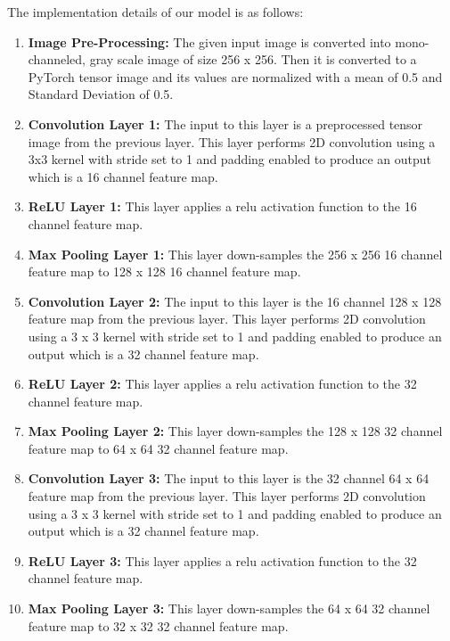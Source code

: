\documentclass[12pt]{article}
\begin{document}
The implementation details of our model is as follows: 
\begin{enumerate}
	\item \textbf{Image Pre-Processing: } The given input image is converted into mono-channeled, gray scale image of size 256 x 256. Then it is converted to a PyTorch tensor image and its values are normalized with a mean of 0.5 and Standard Deviation of 0.5.   
  
	\item \textbf{Convolution Layer 1:} The input to this layer is a preprocessed tensor image from the previous layer. This layer performs 2D convolution using a 3x3 kernel with stride set to 1 and padding enabled to produce an output which is a 16 channel feature map. 
	
	\item \textbf{ReLU Layer 1:} This layer applies a relu activation function to the 16 channel feature map.
	 
	 \item \textbf{Max Pooling Layer 1:} This layer down-samples the 256 x 256 16 channel feature map to 128 x 128 16 channel feature map.
	 
	 \item \textbf{Convolution Layer 2:} The input to this layer is the 16 channel 128 x 128 feature map from the previous layer. This layer performs 2D convolution using a 3 x 3 kernel with stride set to 1 and padding enabled to produce an output which is a 32 channel feature map. 
	 
	 \item \textbf{ReLU Layer 2:} This layer applies a relu activation function to the 32 channel feature map.
	 
	 \item \textbf{Max Pooling Layer 2:} This layer down-samples the 128 x 128 32 channel feature map to 64 x 64 32 channel feature map.
	 
	 \item \textbf{Convolution Layer 3:} The input to this layer is the 32 channel 64 x 64 feature map from the previous layer. This layer performs 2D convolution using a 3 x 3 kernel with stride set to 1 and padding enabled to produce an output which is a 32 channel feature map. 
	 
	 \item \textbf{ReLU Layer 3:} This layer applies a relu activation function to the 32 channel feature map.
	 
	 \item \textbf{Max Pooling Layer 3:} This layer down-samples the 64 x 64 32 channel feature map to 32 x 32 32 channel feature map.
	 

\end{enumerate}
\end{document}
